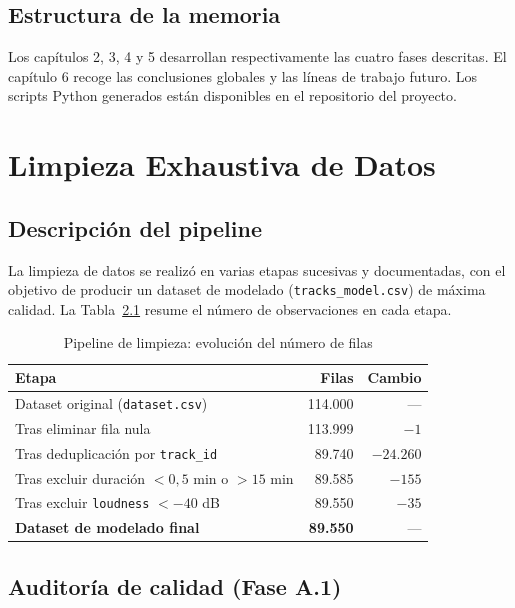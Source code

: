 \documentclass[12pt, a4paper, twoside]{book}
\theoremstyle{definition}
\begin{document}
\section{Estructura de la memoria}

Los capítulos 2, 3, 4 y 5 desarrollan respectivamente las cuatro fases descritas.
El capítulo 6 recoge las conclusiones globales y las líneas de trabajo futuro.
Los scripts Python generados están disponibles en el repositorio del proyecto.

\chapter{Limpieza Exhaustiva de Datos}

\section{Descripción del pipeline}

La limpieza de datos se realizó en varias etapas sucesivas y documentadas, con el
objetivo de producir un dataset de modelado (\texttt{tracks\_model.csv}) de
máxima calidad. La Tabla~\ref{tab:pipeline} resume el número de observaciones
en cada etapa.

\begin{table}[H]
\centering
\caption{Pipeline de limpieza: evolución del número de filas}
\label{tab:pipeline}
\begin{tabular}{lrr}
\toprule
\textbf{Etapa} & \textbf{Filas} & \textbf{Cambio} \\
\midrule
Dataset original (\texttt{dataset.csv}) & 114.000 & --- \\
Tras eliminar fila nula & 113.999 & $-1$ \\
Tras deduplicación por \texttt{track\_id} & 89.740 & $-24.260$ \\
Tras excluir duración $< 0{,}5$ min o $> 15$ min & 89.585 & $-155$ \\
Tras excluir \texttt{loudness} $< -40$ dB & 89.550 & $-35$ \\
\textbf{Dataset de modelado final} & \textbf{89.550} & --- \\
\bottomrule
\end{tabular}
\end{table}

\section{Auditoría de calidad (Fase A.1)}
\end{document}
